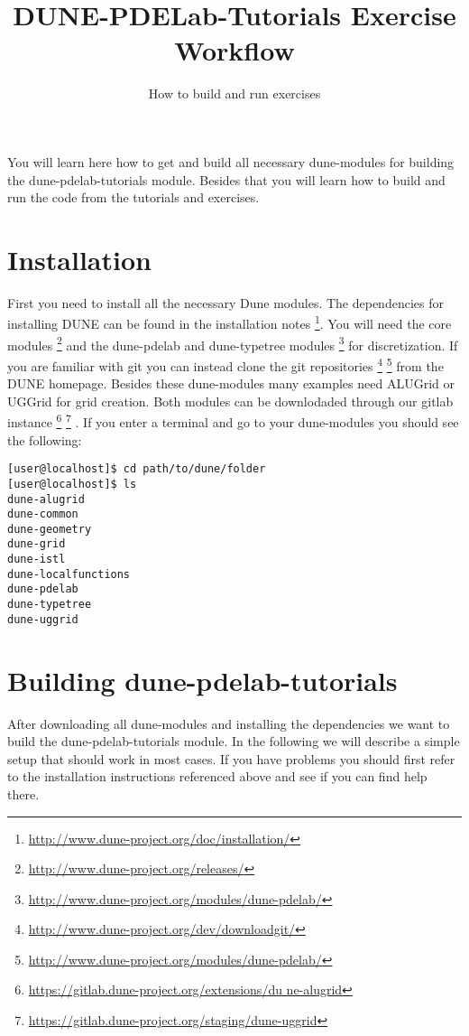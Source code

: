 \documentclass[12pt,a4paper]{article}
\title{\textbf{DUNE-PDELab-Tutorials Exercise Workflow}}
\subtitle{How to build and run exercises}
\begin{document}
\exerciseheader

You will learn here how to get and build all necessary dune-modules
for building the dune-pdelab-tutorials module.  Besides that you will
learn how to build and run the code from the tutorials and exercises.

\section{Installation}

First you need to install all the necessary Dune modules.  The
dependencies for installing DUNE can be found in the installation
notes
\footnote{\href{http://www.dune-project.org/doc/installation/}{http://www.dune-project.org/doc/installation/}}.
You will need the core modules
\footnote{\href{http://www.dune-project.org/releases/}{http://www.dune-project.org/releases/}}
and the dune-pdelab and dune-typetree modules
\footnote{\href{http://www.dune-project.org/modules/dune-pdelab/}{http://www.dune-project.org/modules/dune-pdelab/}}
for discretization.  If you are familiar with git you can instead
clone the git repositories
\footnote{\href{http://www.dune-project.org/dev/downloadgit}{http://www.dune-project.org/dev/downloadgit/}}
\footnote{\href{http://www.dune-project.org/modules/dune-pdelab/}{http://www.dune-project.org/modules/dune-pdelab/}}
from the DUNE homepage.  Besides these dune-modules many examples need
ALUGrid or UGGrid for grid creation.  Both modules can be downlodaded
through our gitlab instance
\footnote{\href{https://gitlab.dune-project.org/extensions/dune-alugrid}{https://gitlab.dune-project.org/extensions/du
ne-alugrid}}
\footnote{\href{https://gitlab.dune-project.org/staging/dune-uggrid}{https://gitlab.dune-project.org/staging/dune-uggrid}}
. If you enter a terminal and go to your dune-modules you should see
the following:
\lstset{language=bash} %
\begin{lstlisting}
[user@localhost]$ cd path/to/dune/folder
[user@localhost]$ ls
dune-alugrid
dune-common
dune-geometry
dune-grid
dune-istl
dune-localfunctions
dune-pdelab
dune-typetree
dune-uggrid
\end{lstlisting}

\section{Building dune-pdelab-tutorials}

After downloading all dune-modules and installing the dependencies we
want to build the dune-pdelab-tutorials module.  In the following we
will describe a simple setup that should work in most cases.  If you
have problems you should first refer to the installation instructions
referenced above and see if you can find help there.
\end{document}
